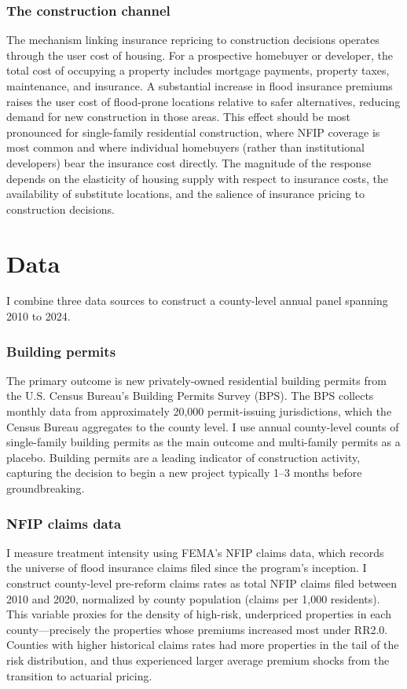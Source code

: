 \documentclass[12pt]{article}
\begin{document}
\subsubsection*{The construction channel} The mechanism linking insurance repricing to construction decisions operates through the user cost of housing. For a prospective homebuyer or developer, the total cost of occupying a property includes mortgage payments, property taxes, maintenance, and insurance. A substantial increase in flood insurance premiums raises the user cost of flood-prone locations relative to safer alternatives, reducing demand for new construction in those areas. This effect should be most pronounced for single-family residential construction, where NFIP coverage is most common and where individual homebuyers (rather than institutional developers) bear the insurance cost directly. The magnitude of the response depends on the elasticity of housing supply with respect to insurance costs, the availability of substitute locations, and the salience of insurance pricing to construction decisions.


\section{Data}
\label{sec:data}

I combine three data sources to construct a county-level annual panel spanning 2010 to 2024.

\subsubsection*{Building permits} The primary outcome is new privately-owned residential building permits from the U.S. Census Bureau's Building Permits Survey (BPS). The BPS collects monthly data from approximately 20,000 permit-issuing jurisdictions, which the Census Bureau aggregates to the county level. I use annual county-level counts of single-family building permits as the main outcome and multi-family permits as a placebo. Building permits are a leading indicator of construction activity, capturing the decision to begin a new project typically 1--3 months before groundbreaking.

\subsubsection*{NFIP claims data} I measure treatment intensity using FEMA's NFIP claims data, which records the universe of flood insurance claims filed since the program's inception. I construct county-level pre-reform claims rates as total NFIP claims filed between 2010 and 2020, normalized by county population (claims per 1,000 residents). This variable proxies for the density of high-risk, underpriced properties in each county---precisely the properties whose premiums increased most under RR2.0. Counties with higher historical claims rates had more properties in the tail of the risk distribution, and thus experienced larger average premium shocks from the transition to actuarial pricing.
\end{document}
